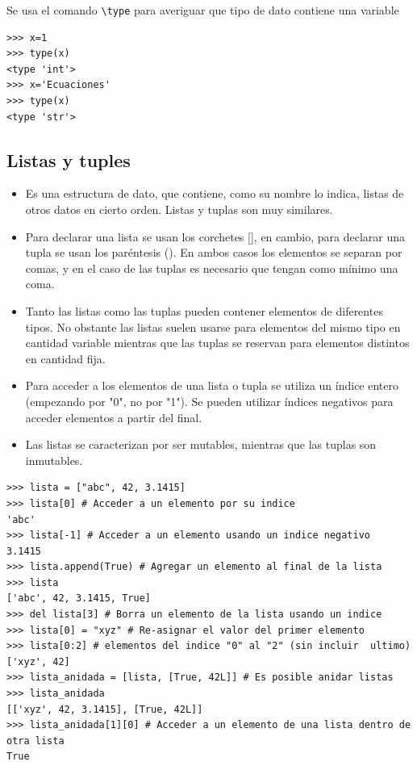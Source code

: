 Se usa el comando \verb~\type~ para averiguar que tipo de dato contiene una variable

 \begin{lstlisting}
>>> x=1
>>> type(x)
<type 'int'>
>>> x='Ecuaciones'
>>> type(x)
<type 'str'>
\end{lstlisting}





\subsection{Listas y tuples}


\begin{itemize}

\item Es una estructura de dato, que contiene, como su nombre lo indica, listas de otros datos en cierto orden. Listas y tuplas son muy similares.

\item Para declarar una lista se usan los corchetes [], en cambio, para declarar una tupla se usan los paréntesis (). En ambos casos los elementos se separan por comas, y en el caso de las tuplas es necesario que tengan como mínimo una coma.

\item    Tanto las listas como las tuplas pueden contener elementos de diferentes tipos. No obstante las listas suelen usarse para elementos del mismo tipo en cantidad variable mientras que las tuplas se reservan para elementos distintos en cantidad fija.
    
\item Para acceder a los elementos de una lista o tupla se utiliza un índice entero (empezando por "0", no por "1"). Se pueden utilizar índices negativos para acceder elementos a partir del final.


\item Las listas se caracterizan por ser mutables, mientras que las tuplas son inmutables.

\end{itemize}






\begin{lstlisting}
>>> lista = ["abc", 42, 3.1415]
>>> lista[0] # Acceder a un elemento por su indice
'abc'
>>> lista[-1] # Acceder a un elemento usando un indice negativo
3.1415
>>> lista.append(True) # Agregar un elemento al final de la lista
>>> lista
['abc', 42, 3.1415, True]
>>> del lista[3] # Borra un elemento de la lista usando un indice
>>> lista[0] = "xyz" # Re-asignar el valor del primer elemento
>>> lista[0:2] # elementos del indice "0" al "2" (sin incluir  ultimo)
['xyz', 42]
>>> lista_anidada = [lista, [True, 42L]] # Es posible anidar listas
>>> lista_anidada
[['xyz', 42, 3.1415], [True, 42L]]
>>> lista_anidada[1][0] # Acceder a un elemento de una lista dentro de otra lista
True
\end{lstlisting}

